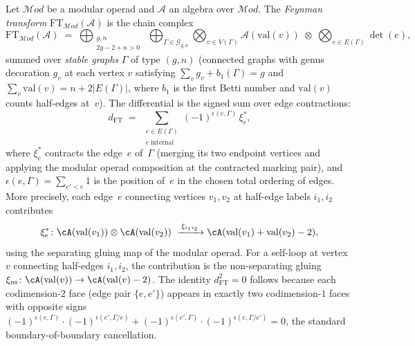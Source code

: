 \begin{definition}\label{def:feynman-transform}
Let $\mathcal{M}od$ be a modular operad and $\mathcal{A}$ an algebra
over $\mathcal{M}od$. The \emph{Feynman transform}
$\mathrm{FT}_{\mathcal{M}od}(\mathcal{A})$
\cite[Definition~4.1]{GeK98} is the chain complex
\[
\mathrm{FT}_{\mathcal{M}od}(\mathcal{A})
\;=\;
\bigoplus_{\substack{g,n \\ 2g-2+n>0}}
\;\bigoplus_{\Gamma \in \mathcal{G}_{g,n}}
\bigotimes_{v \in V(\Gamma)} \mathcal{A}(\mathrm{val}(v))
\;\otimes\;
\bigotimes_{e \in E(\Gamma)} \det(e),
\]
summed over \emph{stable graphs} $\Gamma$ of type $(g,n)$
(connected graphs with genus decoration $g_v$ at each vertex $v$
satisfying $\sum_v g_v + b_1(\Gamma) = g$ and
$\sum_v \mathrm{val}(v) = n + 2|E(\Gamma)|$, where $b_1$ is the
first Betti number and $\mathrm{val}(v)$ counts half-edges at~$v$).
The differential is the signed sum over edge contractions:
\begin{equation}\label{eq:feynman-transform-differential}
d_{\mathrm{FT}}
\;=\;
\sum_{\substack{e \in E(\Gamma) \\ e\;\text{internal}}}
(-1)^{\epsilon(e,\Gamma)}\,
\xi_e^*,
\end{equation}
where $\xi_e^*$ contracts the edge~$e$ of~$\Gamma$ (merging
its two endpoint vertices and applying the modular operad
composition at the contracted marking pair), and
$\epsilon(e, \Gamma) = \sum_{e' < e} 1$ is the position
of~$e$ in the chosen total ordering of edges.
More precisely, each edge~$e$ connecting vertices $v_1, v_2$
at half-edge labels $i_1, i_2$ contributes
\[
\xi_e^*\colon
\cA(\mathrm{val}(v_1)) \otimes \cA(\mathrm{val}(v_2))
\;\xrightarrow{\;\xi_{i_1 i_2}\;}
\cA(\mathrm{val}(v_1) + \mathrm{val}(v_2) - 2),
\]
using the separating gluing map of the modular operad.
For a self-loop at vertex~$v$ connecting half-edges $i_1, i_2$,
the contribution is the non-separating gluing
$\xi_{\mathrm{ns}}\colon \cA(\mathrm{val}(v)) \to
\cA(\mathrm{val}(v) - 2)$.
The identity $d_{\mathrm{FT}}^2 = 0$ follows because each
codimension-$2$ face (edge pair $\{e, e'\}$) appears in
exactly two codimension-$1$ faces with opposite signs
$(-1)^{\epsilon(e,\Gamma)} \cdot (-1)^{\epsilon(e',\Gamma/e)}
+ (-1)^{\epsilon(e',\Gamma)} \cdot
(-1)^{\epsilon(e,\Gamma/e')} = 0$,
the standard boundary-of-boundary cancellation.
\end{definition}

